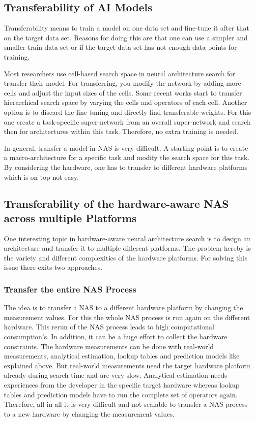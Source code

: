 \documentclass[conference]{IEEEtran}
\begin{document}
\subsection{Transferability of AI Models}

Transferability means to train a model on one data set and fine-tune it after that on the target data set. Reasons for doing this are that one can use a simpler and smaller train data set or if the target data set has not enough data points for training. 

Most researchers use cell-based search space in neural architecture search for transfer their model. For transferring, you modify the network by adding more cells and adjust the input sizes of the cells. Some recent works start to transfer hierarchical search space by varying the cells and operators of each cell. Another option is to discard the fine-tuning and directly find transferable weights. For this one create a task-specific super-network from an overall super-network and search then for architectures within this task. Therefore, no extra training is needed. 

In general, transfer a model in NAS is very difficult. A starting point is to create a macro-architecture for a specific task and modify the search space for this task. By considering the hardware, one has to transfer to different hardware platforms which is on top not easy. 
 
\subsection{Transferability of the hardware-aware NAS across multiple Platforms}

One interesting topic in hardware-aware neural architecture search is to design an architecture and transfer it to multiple different platforms. The problem hereby is the variety and different complexities of the hardware platforms. For solving this issue there exits two approaches.

\subsubsection{Transfer the entire NAS Process}

The idea is to transfer a NAS to a different hardware platform by changing the measurement values. For this the whole NAS process is run again on the different hardware. This rerun of the NAS process leads to high computational consumption's. In addition, it can be a huge effort to collect the hardware constraints. The hardware measurements can be done with real-world measurements, analytical estimation, lookup tables and prediction models like explained above. But real-world measurements need the target hardware platform already during search time and are very slow. Analytical estimation needs experiences from the developer in the specific target hardware whereas lookup tables and prediction models have to run the complete set of operators again. Therefore, all in all it is very difficult and not scalable to transfer a NAS process to a new hardware by changing the measurement values. 
\end{document}
